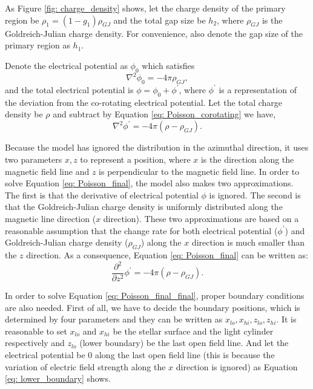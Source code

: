 \documentclass[a4paper, 12pt]{report}
\newcommand{\gj}[0]{
  Goldreich-Julian charge density
}
\newcommand{\myComment}[1]{
  \newline
}
\begin{document}
    As Figure \ref{fig: charge_density} shows, 
    let the charge density of the primary region be $\rho_1 = (1-g_{1}) \rho_{GJ}$ and 
    the total gap size be
    $h_{2}$, where $\rho_{GJ}$ is the Goldreich-Julian charge density. For convenience, 
    also denote the gap size of the primary region as $h_{1}$. 
    \myComment{Then we can calculate electric potential and electric field by solving the 
    Poisson equation }
    Denote the electrical potential as $\phi_{0}$ which satisfies 
    \begin{equation}
      \label{eq: Poisson_corotating}
      \nabla^{2}\phi_{0} = -4\pi\rho_{GJ} ,
    \end{equation}
    and the total electrical potential is $\phi = \phi_{0} + \phi^{\prime}$, 
    where $\phi^{\prime}$ is a representation of the deviation from the co-rotating 
    electrical potential. Let the total charge density be $\rho$ and subtract by
    Equation \ref{eq: Poisson_corotating} we have,
    \begin{equation}
      \label{eq: Poisson_final}
      \nabla^{2}\phi^{\prime} = -4\pi\left(\rho - \rho_{GJ} \right) .
    \end{equation}

    Because the model has ignored the distribution in the azimuthal direction, it uses two 
    parameters $x, z$ to represent a position, where $x$ is the direction along the magnetic 
    field line and $z$ is perpendicular to the magnetic field line. In order to solve 
    Equation \ref{eq: Poisson_final}, the model also makes two approximations. The first is that 
    the derivative of electrical potential $\phi$ is ignored. The second is that the \gj{} 
    is uniformly distributed along the magnetic line direction ($x$ direction). These two 
    approximations are based on a reasonable assumption that the change rate 
    for both electrical potential ($\phi^{\prime}$) and \gj{}($\rho_{GJ}$) along the $x$ 
    direction is much smaller than the $z$ direction. 
    As a consequence, Equation \ref{eq: Poisson_final} can be written as: 
    \begin{equation}
      \label{eq: Poisson_final_final}
      \frac{\partial^2}{\partial z^2} \phi^{\prime} = -4\pi\left(\rho - \rho_{GJ} \right) .
    \end{equation}

    In order to solve Equation \ref{eq: Poisson_final_final}, proper boundary conditions are also 
    needed. First of all, we have to decide the boundary positions, which is determined by 
    four parameters and they can be written as $x_{lo}, x_{hi}, z_{lo}, z_{hi}$. It is 
    reasonable to set $x_{lo}$ and $x_{hi}$ be the stellar surface and the light cylinder 
    respectively and $z_{lo}$ (lower boundary) be the last open field line. And let the 
    electrical potential be $0$ along the last open field line (this is because the 
    variation of electric field strength along the $x$ direction is ignored) as Equation 
    \ref{eq: lower_boundary} shows.  
\end{document}
